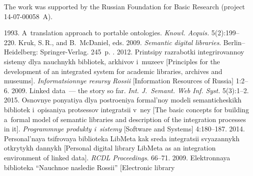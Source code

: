 


\Ack
\noindent
The work was supported by the Russian Foundation for
Basic Research (project 14-07-00058~A).




  \begin{multicols}{2}

\renewcommand{\bibname}{\protect\rmfamily References}

{\small\frenchspacing
 {%
 \begin{thebibliography}{99}
 1993. A~translation approach to portable ontologies. 
\textit{Knowl. Acquis.} 5(2):199--220. 
Kruk, S.\,R., and B.~McDaniel, eds. 2009.
\textit{Semantic digital libraries}. Berlin--Heidelberg: Springer-Verlag. 245~p.
. 2012. Printsipy razrabotki 
integrirovannoy sistemy dlya nauchnykh bibliotek, arkhivov i~muzeev [Principles 
for the development of an integrated system for academic libraries, archives and 
museums]. \textit{Informatsionnye resursy Rossii} [Information Resources of 
Russia] 1:2--6. 
 2009. Linked data~--- the story 
so far. \textit{Int. J.~Semant. Web Inf. Syst.} 5(3):1--2.
 2015. Osnovnye ponyatiya dlya 
postroeniya formal'noy modeli se\-man\-ti\-che\-skikh bibliotek i~opisaniya protsessov 
integratsii v~ney [The basic concepts for building a~formal model of semantic 
libraries and description of the integration processes in it]. \textit{Programmnye 
produkty i~sistemy} [Software and Systems] 4:180--187.
 2014. Personal'naya tsifrovaya 
biblioteka LibMeta kak sreda integratsii svyazannykh otkrytykh dannykh 
[Personal digital library LibMeta as an integration environment of linked data]. 
\textit{RCDL Proceedings}.  66--71.
 2009. 
{Elektronnaya biblioteka ``Nauchnoe nasledie Rossii''} [Electronic library 

\end{thebibliography}}}
\end{multicols}
